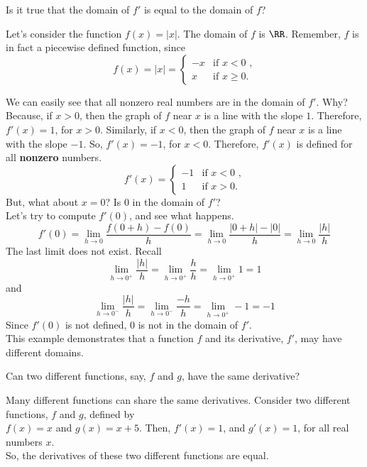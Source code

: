 \documentclass{ximera}
\begin{document}
\begin{question}
Is it true that the domain of $f'$ is equal to the domain of $f$?
  \begin{multipleChoice}
  \end{multipleChoice}
  \begin{feedback}
   Let's consider the function $f(x)=|x|$. The domain of $f$ is  $\RR$.
   Remember, $f$ is in fact a piecewise defined function, since
    \[
f(x)=|x| = 
\begin{cases}
 -x &\text{if $x<0$ ,}\\
  x &\text{if $x\geq 0$}.
\end{cases}
\]

   We can easily see that all nonzero real numbers are in the domain of $f'$. Why?\\
   Because, if $x>0$, then the graph of $f$ near $x$ is a line with the slope $1$. Therefore,  $f'(x)=1$, for $x>0$.  
   Similarly, if $x<0$, then the graph of $f$ near $x$ is a line with the slope $-1$. So, $f'(x)=-1$,  for $x<0$.
  Therefore, $f'(x)$ is defined for all \textbf{nonzero} numbers. 
   \[
f'(x) = 
\begin{cases}
 -1 &\text{if $x<0$ ,}\\
  1 &\text{if $x> 0$}.
\end{cases}
\]
But, what about $x=0$? Is 0 in the domain of $f'$?\\
Let's try to compute $f'(0)$, and see what happens.
\[
		f'(0)=  \lim_{h\to 0} \dfrac{f(0+h) - f(0)}{h}= \lim_{h\to 0} \dfrac{|0+h|-|0| }{h}
		= \lim_{h\to 0} \dfrac{|h| }{h}
		\]
		The last limit does not exist. Recall
		\[
				 \lim_{h\to 0^+} \dfrac{|h| }{h}= \lim_{h\to 0^+} \dfrac{h }{h}=\lim_{h\to 0^+} 1=1
		\]
		and 
		\[
				 \lim_{h\to 0^-} \dfrac{|h| }{h}= \lim_{h\to 0^-} \dfrac{-h }{h}=\lim_{h\to 0^+} -1=-1
		\]
	Since $f'(0)$ is not defined,  $0$ is not in the domain of $f'$.\\
	This example demonstrates that a function $f$ and its derivative, $f'$, may have different domains.
  \end{feedback}
\end{question}

\begin{question}
 Can two different functions, say, $f$ and $g$, have the same derivative?
  \begin{multipleChoice}
  \end{multipleChoice}
  \begin{feedback}
    Many different functions can share the same derivatives.
    Consider two different functions, $f$ and $g$, defined by\\
    $f(x)=x$ and $g(x)=x+5$.
    Then, $f'(x)=1$, and $g'(x)=1$, for all real numbers $x$.\\
    So,  the derivatives of these two different functions are equal.
    
      \end{feedback}
\end{question}
\end{document}
